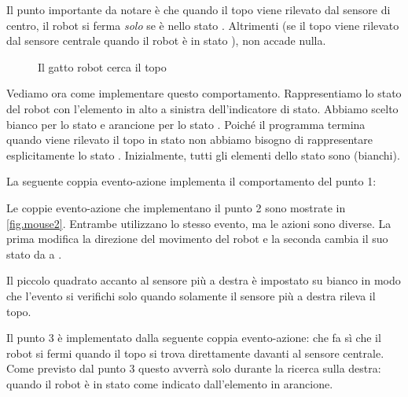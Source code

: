 Il punto importante da notare è che quando il topo viene rilevato dal
sensore di centro, il robot si ferma \emph{solo} se è nello stato
.
Altrimenti (se il topo viene rilevato dal sensore centrale quando il robot
è in stato ), non accade nulla.

\begin{figure}
	\hfill
	\caption{Il gatto robot cerca il topo}
\end{figure}

Vediamo ora come implementare questo comportamento. Rappresentiamo lo stato del robot
con l'elemento in alto a sinistra dell'indicatore di stato.
Abbiamo scelto bianco per lo stato
 e arancione per lo stato .
Poiché il programma termina quando viene rilevato il topo in stato
 non abbiamo bisogno di rappresentare esplicitamente lo stato .
Inizialmente, tutti gli elementi dello stato sono  (bianchi).

La seguente coppia evento-azione implementa il comportamento del punto 1:

Le coppie evento-azione che implementano il punto 2 sono mostrate in \cref{fig.mouse2}.
Entrambe utilizzano lo stesso evento, ma le azioni sono diverse. La prima modifica
la direzione del movimento del robot e la seconda cambia il suo stato
da  a .

Il piccolo quadrato accanto al sensore più a destra è impostato su bianco in modo che l'evento
si verifichi solo quando solamente il sensore più a destra rileva il topo.

Il punto 3 è implementato dalla seguente coppia evento-azione:
che fa sì che il robot si fermi quando il topo si trova direttamente davanti al sensore centrale.
Come previsto dal punto 3 questo avverrà solo durante la ricerca sulla destra: quando il robot è in stato  come indicato dall'elemento in arancione.

\vfill
{}
